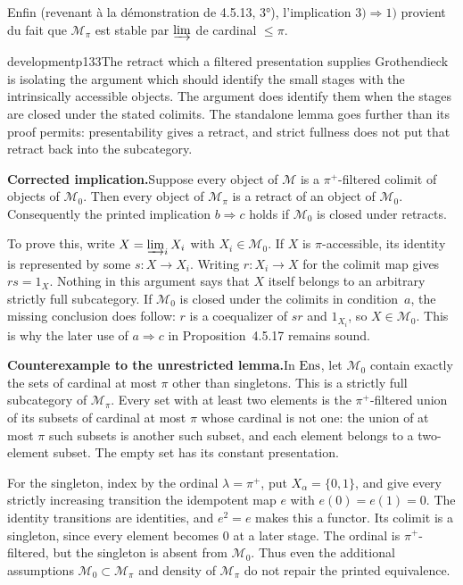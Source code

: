 Enfin (revenant à la démonstration de 4.5.13, 3°), l'implication $3) \Longrightarrow 1)$ provient du fait que $\mathcal{M}_{\pi}$ est stable par $\varinjlim$ de cardinal $\leqslant \pi$.

\begin{dcomment}{development}{p133}{The retract which a filtered presentation supplies}
Grothendieck is isolating the argument which should identify the small stages with the intrinsically accessible objects. The argument does identify them when the stages are closed under the stated colimits. The standalone lemma goes further than its proof permits: presentability gives a retract, and strict fullness does not put that retract back into the subcategory.

\textbf{Corrected implication.}\quad Suppose every object of $\mathcal M$ is a $\pi^+$-filtered colimit of objects of $\mathcal M_0$. Then every object of $\mathcal M_\pi$ is a retract of an object of $\mathcal M_0$. Consequently the printed implication $b\Rightarrow c$ holds if $\mathcal M_0$ is closed under retracts.

To prove this, write $X=\varinjlim_i X_i$ with $X_i\in\mathcal M_0$. If $X$ is $\pi$-accessible, its identity is represented by some $s:X\to X_i$. Writing $r:X_i\to X$ for the colimit map gives $rs=1_X$. Nothing in this argument says that $X$ itself belongs to an arbitrary strictly full subcategory. If $\mathcal M_0$ is closed under the colimits in condition~$a$, the missing conclusion does follow: $r$ is a coequalizer of $sr$ and $1_{X_i}$, so $X\in\mathcal M_0$. This is why the later use of $a\Rightarrow c$ in Proposition~4.5.17 remains sound.

\textbf{Counterexample to the unrestricted lemma.}\ours\quad In $\mathrm{Ens}$, let $\mathcal M_0$ contain exactly the sets of cardinal at most $\pi$ other than singletons. This is a strictly full subcategory of $\mathcal M_\pi$. Every set with at least two elements is the $\pi^+$-filtered union of its subsets of cardinal at most $\pi$ whose cardinal is not one: the union of at most $\pi$ such subsets is another such subset, and each element belongs to a two-element subset. The empty set has its constant presentation.

For the singleton, index by the ordinal $\lambda=\pi^+$, put $X_\alpha=\{0,1\}$, and give every strictly increasing transition the idempotent map $e$ with $e(0)=e(1)=0$. The identity transitions are identities, and $e^2=e$ makes this a functor. Its colimit is a singleton, since every element becomes $0$ at a later stage. The ordinal is $\pi^+$-filtered, but the singleton is absent from $\mathcal M_0$. Thus even the additional assumptions $\mathcal M_0\subset\mathcal M_\pi$ and density of $\mathcal M_\pi$ do not repair the printed equivalence.


\end{dcomment}
